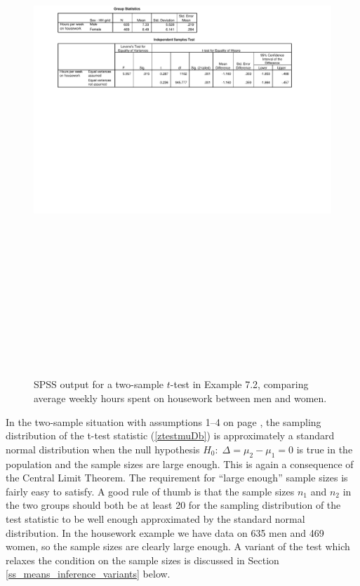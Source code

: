 \begin{figure}
\caption{SPSS output for a two-sample $t$-test in Example 7.2, comparing
average weekly hours spent on housework between men and women.}
\label{f_spss2test}
\begin{center}
\includegraphics[bb=70 300 750 585,angle=90, height=200mm]{spss2t}
\end{center}
\end{figure}

\label{p_ztestass}
In the two-sample situation with assumptions 1--4 on page
\pageref{p_2sample}, the sampling distribution of the t-test statistic
(\ref{ztestmuDb}) is approximately a standard normal distribution
when
the null hypothesis $H_{0}: \; \Delta=\mu_{2}-\mu_{1}=0$ is true in the
population and the sample sizes are large enough.
This is again a consequence of the Central Limit Theorem. The
requirement for ``large enough'' sample sizes is fairly easy to satisfy.
A good rule of thumb is that the sample sizes $n_{1}$ and $n_{2}$ in the
two groups should both be at least 20 for the sampling distribution of
the test statistic to be well enough approximated by the standard normal
distribution. In the housework example we have data on 635 men and 469
women, so the sample sizes are clearly large enough. A variant of the test which
relaxes the condition on the sample sizes is
discussed in Section \ref{ss_means_inference_variants} below.


